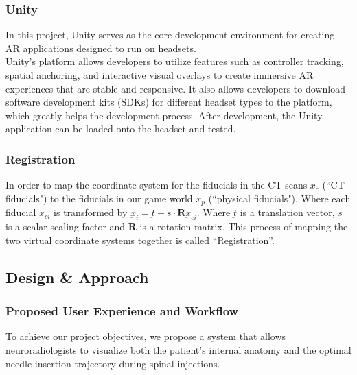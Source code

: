 \documentclass[12pt]{article}
\begin{document}
\subsubsection{Unity}
In this project, Unity serves as the core development environment for creating AR applications designed to run on headsets.\\

Unity’s platform allows developers to utilize features such as controller tracking, spatial anchoring, and interactive visual overlays to create immersive AR experiences that are stable and responsive. It also allows developers to download software development kits (SDKs) for different headset types to the platform, which greatly helps the development process. After development, the Unity application can be loaded onto the headset and tested.

\subsubsection{Registration}
\label{reg:Registration}
In order to map the coordinate system for the fiducials in the CT scans \(x_c\)  (``CT fiducials") to the fiducials in our game world \(x_p\) (``physical fiducials"). Where each fiducial $x_{ci}$ is transformed by $\underbar{x}_i = \underbar{t} + s \cdot \textbf{R} \underbar{x}_{ci}$. Where $\underbar{t}$ is a translation vector, $s$ is a scalar scaling factor and $\textbf{R}$ is a rotation matrix. This process of mapping the two virtual coordinate systems together is called ``Registration''. 

\subsection{Design \& Approach}

\subsubsection{Proposed User Experience and Workflow}
To achieve our project objectives, we propose a system that allows neuroradiologists to visualize both the patient's internal anatomy and the optimal needle insertion trajectory during spinal injections.\\
\end{document}
